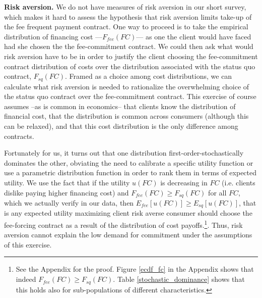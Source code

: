 \documentclass[oneside,11pt]{article}
\begin{document}
\vspace{.1in}
\noindent \textbf{Risk aversion.} We do not have measures of risk aversion in our short survey, which makes it hard to assess the hypothesis that risk aversion limits take-up of the fee frequent payment contract. One way to proceed is to take the empirical distribution of financing cost ---$F_{fee}(FC)$--- as one the client would have faced had she chosen the the fee-commitment contract. We could then ask what would risk aversion have to be in order to justify the client choosing the fee-commitment contract distribution of costs over the distribution associated with the status quo contract, $F_{sq}(FC)$. Framed as a choice among cost distributions, we can calculate what risk aversion is needed to rationalize the overwhelming choice of the status quo contract over the fee-commitment contract. This exercise of course assumes --as is common in economics-- that clients know the distribution of financial cost, that the distribution is common across consumers (although this can be relaxed), and that this cost distribution is the only difference among contracts. 

Fortunately for us, it turns out that one distribution first-order-stochastically dominates the other, obviating the need to calibrate a specific utility function or use a parametric distribution function in order to rank them in terms of expected utility. We use the fact that if the utility $u(FC)$ is decreasing in $FC$ (i.e. clients dislike paying higher financing cost) and $F_{fee}(FC) \geq F_{sq}(FC)$ for all $FC$, which we actually verify in our data, then $E_{fee}[u(FC)] \geq E_{sq}[u(FC)]$, that is any expected utility maximizing client risk averse consumer should choose the fee-forcing contract as a result of the distribution of cost payoffs.\footnote{See the Appendix for the proof. Figure \ref{ecdf_fc} in the Appendix shows that indeed $F_{fee}(FC) \geq F_{sq}(FC)$. Table \ref{stochastic_dominance} shows that this holds also for sub-populations of different characteristics.}. Thus, risk aversion cannot explain the low demand for commitment under the assumptions of this exercise.   

\end{document}
